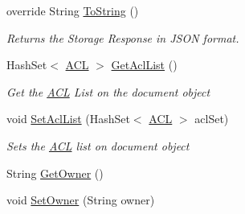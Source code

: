 \begin{DoxyCompactItemize}
override String \hyperlink{classcom_1_1shephertz_1_1app42_1_1paas_1_1sdk_1_1csharp_1_1_meta_response_1_1_j_s_o_n_document_af21261c9646b25c476a28d3a27cdb0f0}{To\+String} ()
\begin{DoxyCompactList}\small\item\em Returns the Storage Response in J\+S\+O\+N format. \end{DoxyCompactList}\item 
Hash\+Set$<$ \hyperlink{classcom_1_1shephertz_1_1app42_1_1paas_1_1sdk_1_1csharp_1_1_a_c_l}{A\+C\+L} $>$ \hyperlink{classcom_1_1shephertz_1_1app42_1_1paas_1_1sdk_1_1csharp_1_1_meta_response_1_1_j_s_o_n_document_a971161fe0fcbd72e7701613dc2b4eae5}{Get\+Acl\+List} ()
\begin{DoxyCompactList}\small\item\em Get the \hyperlink{classcom_1_1shephertz_1_1app42_1_1paas_1_1sdk_1_1csharp_1_1_a_c_l}{A\+C\+L} List on the document object \end{DoxyCompactList}\item 
void \hyperlink{classcom_1_1shephertz_1_1app42_1_1paas_1_1sdk_1_1csharp_1_1_meta_response_1_1_j_s_o_n_document_aec0123a6f7f4066fd2ad1df31318043b}{Set\+Acl\+List} (Hash\+Set$<$ \hyperlink{classcom_1_1shephertz_1_1app42_1_1paas_1_1sdk_1_1csharp_1_1_a_c_l}{A\+C\+L} $>$ acl\+Set)
\begin{DoxyCompactList}\small\item\em Sets the \hyperlink{classcom_1_1shephertz_1_1app42_1_1paas_1_1sdk_1_1csharp_1_1_a_c_l}{A\+C\+L} list on document object \end{DoxyCompactList}\item 
String \hyperlink{classcom_1_1shephertz_1_1app42_1_1paas_1_1sdk_1_1csharp_1_1_meta_response_1_1_j_s_o_n_document_a1422c72086b8b33e11ecead3f73f4cac}{Get\+Owner} ()
\item 
void \hyperlink{classcom_1_1shephertz_1_1app42_1_1paas_1_1sdk_1_1csharp_1_1_meta_response_1_1_j_s_o_n_document_a7f90e9b94825e6f5d8d7b382e9233c33}{Set\+Owner} (String owner)
\end{DoxyCompactItemize}
